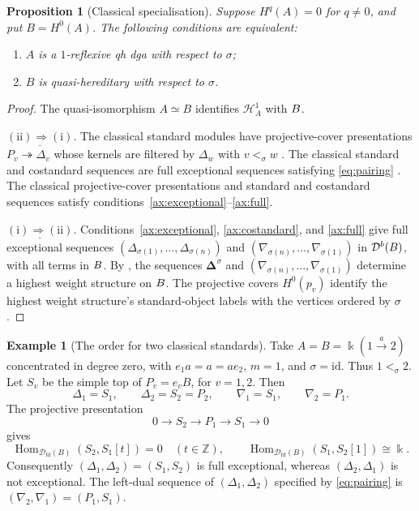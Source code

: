 \documentclass[11pt,a4paper]{article}
\newcommand{\D}{\mathcal D}
\renewcommand{\H}{\mathcal H}
\newcommand{\ZZ}{\mathbb{Z}}
\newcommand{\std}{\Delta}
\newcommand{\costd}{\nabla}
\DeclareMathOperator{\fd}{fd}
\DeclareMathOperator{\Hom}{Hom}
\let\mod\relax
\DeclareMathOperator{\mod}{mod}
\theoremstyle{plain}
\newtheorem{proposition}[theorem]{Proposition}
\theoremstyle{definition}
\newtheorem{example}[theorem]{Example}
\numberwithin{equation}{section}
\begin{document}
\begin{proposition}[Classical specialisation]\label{prop:classical}
Suppose $H^q(A)=0$ for $q\neq0$, and put $B=H^0(A)$.
The following conditions are equivalent:
\begin{enumerate}[label=\textup{(\roman*)}]
 \item $A$ is a $1$-reflexive qh dga with respect to $\sigma$;
 \item $B$ is quasi-hereditary with respect to $\sigma$.
\end{enumerate}
\end{proposition}
\begin{proof}
The quasi-isomorphism $A\simeq B$ identifies $\H_A^1$ with $\mod B$.

\noindent$\underline{(\mathrm{ii})\Rightarrow(\mathrm{i})}$.
The classical standard modules have projective-cover presentations
$P_v\twoheadrightarrow\std_v$ whose kernels are filtered by
$\std_w$ with $v<_\sigma w$ \cite{DR92}.
The classical standard and costandard sequences are full exceptional
sequences satisfying \eqref{eq:pairing}
\cite[Lemma 2.2]{BB26}. The classical projective-cover presentations
and standard and costandard sequences satisfy
conditions~\ref{ax:exceptional}--\ref{ax:full}.

\noindent$\underline{(\mathrm{i})\Rightarrow(\mathrm{ii})}$.
Conditions~\ref{ax:exceptional}, \ref{ax:costandard}, and \ref{ax:full}
give full exceptional sequences
$(\std_{\sigma(1)},\ldots,\std_{\sigma(n)})$ and
$(\costd_{\sigma(n)},\ldots,\costd_{\sigma(1)})$ in
$\D^b(\mod B)$, with all terms in $\mod B$.
By \cite[Theorem 3.8]{BB26}, the sequences
$\boldsymbol\std^\sigma$ and
$(\costd_{\sigma(n)},\ldots,\costd_{\sigma(1)})$
determine a highest weight structure on $\mod B$.
The projective covers $H^0(p_v)$ identify the highest weight structure's
standard-object labels with the vertices ordered by $\sigma$.
\end{proof}

\begin{example}[The order for two classical standards]\label{ex:classical-order}
Take $A=B=\Bbbk(1\xrightarrow{a}2)$ concentrated in degree zero,
with $e_1a=a=ae_2$, $m=1$, and $\sigma=\mathrm{id}$. Thus $1<_\sigma2$.
Let $S_v$ be the simple top of $P_v=e_vB$, for $v=1,2$. Then
\begin{equation}\label{eq:classical-order-objects}
 \std_1=S_1,\qquad \std_2=S_2=P_2,\qquad
 \costd_1=S_1,\qquad \costd_2=P_1.
\end{equation}
The projective presentation
\begin{equation}\label{eq:classical-order-extension}
 0\longrightarrow S_2\longrightarrow P_1\longrightarrow S_1
 \longrightarrow0
\end{equation}
gives
\begin{equation}\label{eq:classical-order-hom}
 \Hom_{\D_{\fd}(B)}(S_2,S_1[t])=0\quad(t\in\ZZ),\qquad
 \Hom_{\D_{\fd}(B)}(S_1,S_2[1])\cong\Bbbk.
\end{equation}
Consequently $(\std_1,\std_2)=(S_1,S_2)$ is full exceptional,
whereas $(\std_2,\std_1)$ is not exceptional. The left-dual sequence
of $(\std_1,\std_2)$ specified by \eqref{eq:pairing} is
$(\costd_2,\costd_1)=(P_1,S_1)$.
\end{example}
\end{document}
